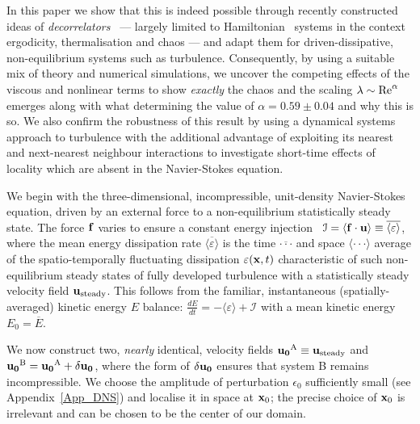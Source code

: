 \documentclass[amsmath,amssymb,amsbsy,pre,twocolumn,tightenlines,superscriptaddress,floatfix]{revtex4-2}
\begin{document}
In this paper we show that this is indeed possible through recently
constructed ideas of \textit{decorrelators}~\cite{Lightcone} --- largely
limited to Hamiltonian~\cite{Subhro_PRB,Subhro_PRL,GTEuler} systems in the
context ergodicity, thermalisation and chaos --- and adapt them for
driven-dissipative, non-equilibrium systems such as turbulence. Consequently,
by using a suitable mix of theory and numerical simulations, we uncover the
competing effects of the viscous and nonlinear terms to show \textit{exactly}
the chaos and the scaling $\lambda \sim {\rm Re}^\alpha$ emerges along with
what determining the value of $\alpha = 0.59 \pm 0.04$ and why this
is so. We also confirm the robustness of this result by using a dynamical
systems approach to turbulence with the additional advantage of exploiting its
nearest and next-nearest neighbour interactions to investigate short-time
effects of locality which are absent in the Navier-Stokes equation.


We begin with the three-dimensional, incompressible, unit-density Navier-Stokes equation, driven by an external
force to a non-equilibrium statistically steady state.
The force ${\bf f}$ varies to ensure a constant energy injection~\cite{Pope_forcing} $\mathcal{I}
= \langle {\bf f}\cdot {\bf u} \rangle \equiv \overline{\langle \varepsilon
\rangle}$, where the mean energy dissipation rate $\overline{\langle \varepsilon
\rangle}$ is the time $\overline{\cdot \cdot \cdot}$ and space $\langle \cdot
\cdot \cdot \rangle$ average of the spatio-temporally fluctuating dissipation
$\varepsilon ({\bf x},t)$ characteristic of such non-equilibrium steady states of fully developed
turbulence with a statistically steady velocity field ${\bf u}_{\rm
steady}$. This follows from the familiar, instantaneous (spatially-averaged)
kinetic energy $E$ balance: $\frac{dE}{dt} = -\langle \varepsilon \rangle +
\mathcal{I}$ with a mean kinetic energy $E_0 = \overline {E}$.

We now construct two, \textit{nearly} identical,  velocity fields ${\bf u_0}^{\rm A}
\equiv {\bf u}_{\rm steady}$ and ${\bf u_0}^{\rm B} = {\bf u_0}^{\rm A} +
\delta {\bf u_0}$, where the form of $\delta {\bf u_0}$ ensures that system B
remains incompressible.  We choose the amplitude of perturbation $\epsilon_0$
sufficiently small (see Appendix~\ref{App_DNS}) and localise it in space at ${\bf x}_0$; the precise choice
of ${\bf x}_0$ is irrelevant and can be chosen to be the center of our domain.
\end{document}
